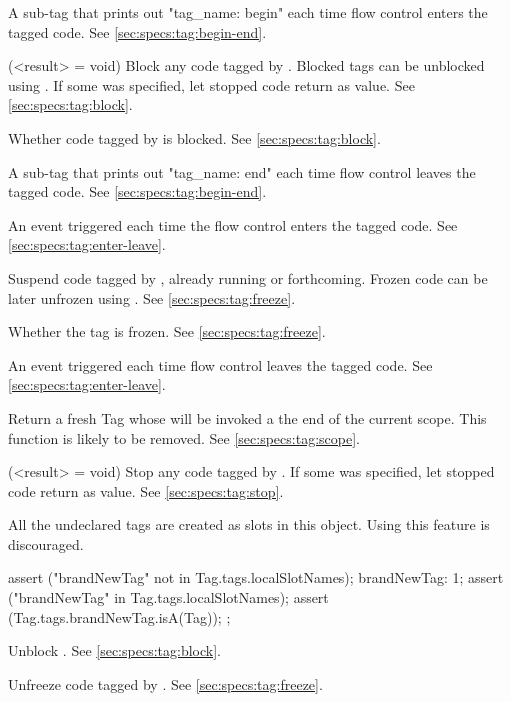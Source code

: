 \begin{urbiscriptapi}
\item[begin]
  A sub-tag that prints out "tag\_name: begin" each time flow control
  enters the tagged code. See \autoref{sec:specs:tag:begin-end}.

\item[block](<result> = void)%
  Block any code tagged by \this.  Blocked tags can be
  unblocked using .  If some  was
  specified, let stopped code return  as value.  See
  \autoref{sec:specs:tag:block}.

\item[blocked]
  Whether code tagged by \this is blocked.  See
  \autoref{sec:specs:tag:block}.

\item[end]
  A sub-tag that prints out "tag\_name: end" each time flow control
  leaves the tagged code. See \autoref{sec:specs:tag:begin-end}.

\item[enter] An event triggered each time the flow control enters the
  tagged code.  See \autoref{sec:specs:tag:enter-leave}.

\item[freeze] Suspend code tagged by \this, already running or
  forthcoming.  Frozen code can be later unfrozen using .
  See \autoref{sec:specs:tag:freeze}.

\item[frozen]
  Whether the tag is frozen. See  \autoref{sec:specs:tag:freeze}.

\item[leave] An event triggered each time flow control leaves the
  tagged code.  See \autoref{sec:specs:tag:enter-leave}.

\item[scope] Return a fresh Tag whose  will be invoked a the
  end of the current scope.  This function is likely to be removed.  See
  \autoref{sec:specs:tag:scope}.

\item[stop](<result> = void)%
  Stop any code tagged by \this.  If some  was
  specified, let stopped code return  as value.
  See \autoref{sec:specs:tag:stop}.

\item[tags] All the undeclared tags are created as slots in this
  object.  Using this feature is discouraged.
\begin{urbiscript}
{
  assert ("brandNewTag" not in Tag.tags.localSlotNames);
  brandNewTag: 1;
  assert ("brandNewTag" in Tag.tags.localSlotNames);
  assert (Tag.tags.brandNewTag.isA(Tag));
};
\end{urbiscript}

\item[unblock]
  Unblock \this.  See \autoref{sec:specs:tag:block}.

\item[unfreeze]
  Unfreeze code tagged by \this.  See
  \autoref{sec:specs:tag:freeze}.
\end{urbiscriptapi}


